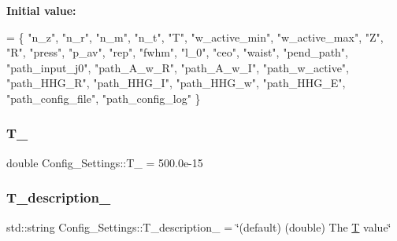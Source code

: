 {\bfseries Initial value\+:}
\begin{DoxyCode}
= \{
  \textcolor{stringliteral}{"n\_z"}, \textcolor{stringliteral}{"n\_r"}, \textcolor{stringliteral}{"n\_m"},
  \textcolor{stringliteral}{"n\_t"}, \textcolor{stringliteral}{"T"}, \textcolor{stringliteral}{"w\_active\_min"}, \textcolor{stringliteral}{"w\_active\_max"},
  \textcolor{stringliteral}{"Z"}, \textcolor{stringliteral}{"R"},
  \textcolor{stringliteral}{"press"},
  \textcolor{stringliteral}{"p\_av"}, \textcolor{stringliteral}{"rep"}, \textcolor{stringliteral}{"fwhm"}, \textcolor{stringliteral}{"l\_0"}, \textcolor{stringliteral}{"ceo"}, \textcolor{stringliteral}{"waist"},
  \textcolor{stringliteral}{"pend\_path"},
  \textcolor{stringliteral}{"path\_input\_j0"},
  \textcolor{stringliteral}{"path\_A\_w\_R"}, \textcolor{stringliteral}{"path\_A\_w\_I"}, \textcolor{stringliteral}{"path\_w\_active"},
  \textcolor{stringliteral}{"path\_HHG\_R"}, \textcolor{stringliteral}{"path\_HHG\_I"}, \textcolor{stringliteral}{"path\_HHG\_w"}, \textcolor{stringliteral}{"path\_HHG\_E"},
  \textcolor{stringliteral}{"path\_config\_file"}, \textcolor{stringliteral}{"path\_config\_log"}
\}
\end{DoxyCode}
\mbox{\label{class_config___settings_a4f774e23910af488b9006a9c2a0aa1d3}} 
\subsubsection{\texorpdfstring{T\+\_\+}{T\_}}
{\footnotesize\ttfamily double Config\+\_\+\+Settings\+::\+T\+\_\+ = 500.\+0e-\/15\hspace{0.3cm}{\ttfamily [private]}}

\mbox{\label{class_config___settings_a6975e74e82073d2ae4d75c38fb56c83c}} 
\subsubsection{\texorpdfstring{T\+\_\+description\+\_\+}{T\_description\_}}
{\footnotesize\ttfamily std\+::string Config\+\_\+\+Settings\+::\+T\+\_\+description\+\_\+ = \char`\"{}(default) (double) The \hyperlink{class_config___settings_a1ed40710ec225b2f91d275b4fc8f64ef}{T} value\char`\"{}\hspace{0.3cm}{\ttfamily [private]}}

